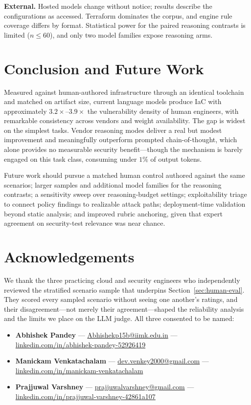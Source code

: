 \documentclass[conference]{IEEEtran}
\begin{document}
\textbf{External.} Hosted models change without notice; results describe the
configurations as accessed. Terraform dominates the corpus, and engine rule
coverage differs by format. Statistical power for the paired reasoning contrasts
is limited ($n\leq60$), and only two model families expose reasoning arms.

\section{Conclusion and Future Work}

Measured against human-authored infrastructure through an identical toolchain
and matched on artifact size, current language models produce IaC with
approximately $3.2\times$--$3.9\times$ the vulnerability density of human
engineers, with remarkable consistency across vendors and weight availability.
The gap is widest on the simplest tasks. Vendor reasoning modes deliver a real
but modest improvement and meaningfully outperform prompted chain-of-thought,
which alone provides no measurable security benefit---though the mechanism is
barely engaged on this task class, consuming under $1\%$ of output tokens.

Future work should pursue a matched human control authored against the same
scenarios; larger samples and additional model families for the reasoning
contrasts; a sensitivity sweep over reasoning-budget settings; exploitability
triage to connect policy findings to realizable attack paths; deployment-time
validation beyond static analysis; and improved rubric anchoring, given that
expert agreement on security-test relevance was near chance.

\section*{Acknowledgements}
We thank the three practicing cloud and security engineers who independently
reviewed the stratified scenario sample that underpins
Section~\ref{sec:human-eval}. They scored every sampled scenario without seeing
one another's ratings, and their disagreement---not merely their
agreement---shaped the reliability analysis and the limits we place on the LLM
judge. All three consented to be named:

\begin{itemize}\raggedright
  \item \textbf{Abhishek Pandey} ---
    \href{mailto:Abhishekp15b@iimk.edu.in}{Abhishekp15b@iimk.edu.in} ---
    \href{https://www.linkedin.com/in/abhishek-pandey-52926419/}{linkedin.com/in/abhishek-pandey-52926419}
  \item \textbf{Manickam Venkatachalam} ---
    \href{mailto:dev.venkey2000@gmail.com}{dev.venkey2000@gmail.com} ---
    \href{https://www.linkedin.com/in/manickam-venkatachalam/}{linkedin.com/in/manickam-venkatachalam}
  \item \textbf{Prajjuwal Varshney} ---
    \href{mailto:prajjuwalvarshney@gmail.com}{prajjuwalvarshney@gmail.com} ---
    \href{https://in.linkedin.com/in/prajjuwal-varshney-42861a107}{linkedin.com/in/prajjuwal-varshney-42861a107}
\end{itemize}
\end{document}
